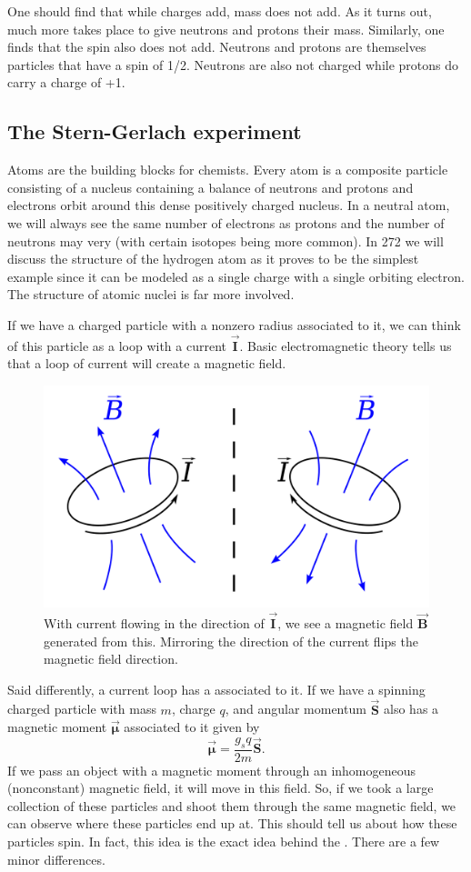 \documentclass{article}
\newcommand{\vecS}{\boldsymbol{\vec{S}}}
\begin{document}
One should find that while charges add, mass does not add.  As it turns out, much more takes place to give neutrons and protons their mass.  Similarly, one finds that the spin also does not add. Neutrons and protons are themselves particles that have a spin of 1/2. Neutrons are also not charged while protons do carry a charge of +1.  

\subsection{The Stern-Gerlach experiment}

Atoms are the building blocks for chemists. Every atom is a composite particle consisting of a nucleus containing a balance of neutrons and protons and electrons orbit around this dense positively charged nucleus.  In a neutral atom, we will always see the same number of electrons as protons and the number of neutrons may very (with certain isotopes being more common). In 272 we will discuss the structure of the hydrogen atom as it proves to be the simplest example since it can be modeled as a single charge with a single orbiting electron. The structure of atomic nuclei is far more involved.

If we have a charged particle with a nonzero radius associated to it, we can think of this particle as a loop with a current $\boldsymbol{\vec{I}}$. Basic electromagnetic theory tells us that a loop of current will create a magnetic field.

\begin{figure}[H]
    \centering
    \includegraphics[width=.55\textwidth]{magnetic_field.png}
    \caption{With current flowing in the direction of $\boldsymbol{\vec{I}}$, we see a magnetic field $\boldsymbol{\vec{B}}$ generated from this.  Mirroring the direction of the current flips the magnetic field direction.}
\end{figure}

Said differently, a current loop has a  associated to it. If we have a spinning charged particle with mass $m$, charge $q$, and angular momentum $\vecS$ also has a magnetic moment $\boldsymbol{\vec{\mu}}$ associated to it given by
\[
\boldsymbol{\vec{\mu}} = \frac{g_s q}{2m}\vecS.
\]
If we pass an object with a magnetic moment through an inhomogeneous (nonconstant) magnetic field, it will move in this field. So, if we took a large collection of these particles and shoot them through the same magnetic field, we can observe where these particles end up at. This should tell us about how these particles spin.  In fact, this idea is the exact idea behind the . There are a few minor differences.
\end{document}
